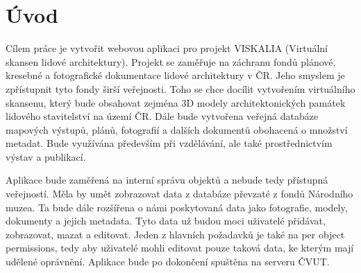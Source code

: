 \chapter*{Úvod}
\label{0-uvod}

Cílem práce je vytvořit webovou aplikaci pro projekt VISKALIA
(Virtuální skansen lidové architektury). Projekt se zaměřuje na
záchranu fondů plánové, kresebné a fotografické dokumentace lidové
architektury v ČR. Jeho smyslem je zpřístupnit tyto fondy širší
veřejnosti. Toho se chce docílit vytvořením virtuálního skansenu,
který bude obsahovat zejména 3D modely architektonických památek
lidového stavitelství na území ČR. Dále bude vytvořena veřejná
databáze mapových výstupů, plánů, fotografií a dalších dokumentů
obohacená o množství metadat. Bude využívána především při vzdělávání,
ale také prostřednictvím výstav a publikací.

Aplikace bude zaměřená na interní správu objektů a nebude tedy přístupná
veřejností. Měla by umět zobrazovat data z databáze převzaté
z fondů Národního muzea. Ta bude dále rozšířena o námi poskytovaná
data jako fotografie, modely, dokumenty a jejich metadata. Tyto data
už budou moci uživatelé přidávat, zobrazovat, mazat a editovat. Jeden
z hlavních požadavků je také na per object permissions, tedy aby
uživatelé mohli editovat pouze taková data, ke kterým mají udělené
oprávnění. Aplikace bude po dokončení spuštěna na serveru ČVUT.


